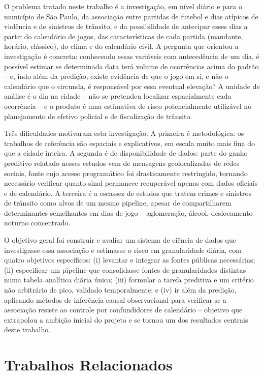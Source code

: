 \documentclass[12pt]{article}
\begin{document}
O problema tratado neste trabalho é a investigação, em nível diário e para
o município de São Paulo, da associação entre partidas de futebol e dias
atípicos de violência e de sinistros de trânsito, e da possibilidade de
antecipar esses dias a partir do calendário de jogos, das características
de cada partida (mandante, horário, clássico), do clima e do calendário
civil. A pergunta que orientou a investigação é concreta: conhecendo essas
variáveis com antecedência de um dia, é possível estimar se determinada
data terá volume de ocorrências acima do padrão -- e, indo além da
predição, existe evidência de que o jogo em si, e não o calendário que o
circunda, é responsável por essa eventual elevação? A unidade de análise é
o dia na cidade -- não se pretendeu localizar espacialmente cada
ocorrência -- e o produto é uma estimativa de risco potencialmente
utilizável no planejamento de efetivo policial e de fiscalização de
trânsito.

Três dificuldades motivaram esta investigação. A primeira é metodológica:
os trabalhos de referência \cite{kurland2014,ristea2018,ristea2020} são
espaciais e explicativos, em escala muito mais fina do que a cidade
inteira. A segunda é de disponibilidade de dados: parte do ganho preditivo
relatado nesses estudos vem de mensagens geolocalizadas de redes sociais,
fonte cujo acesso programático foi drasticamente restringido, tornando
necessário verificar quanto sinal permanece recuperável apenas com dados
oficiais e de calendário. A terceira é a escassez de estudos que tratem
crimes e sinistros de trânsito como alvos de um mesmo pipeline, apesar de
compartilharem determinantes semelhantes em dias de jogo -- aglomeração,
álcool, deslocamento noturno concentrado.

O objetivo geral foi construir e avaliar um sistema de ciência de dados
que investigasse essa associação e estimasse o risco em granularidade
diária, com quatro objetivos específicos: (i) levantar e integrar as
fontes públicas necessárias; (ii) especificar um pipeline que consolidasse
fontes de granularidades distintas numa tabela analítica diária única;
(iii) formular a tarefa preditiva e um critério não arbitrário de pico,
validado temporalmente; e (iv) ir além da predição, aplicando métodos de
inferência causal observacional para verificar se a associação resiste ao
controle por confundidores de calendário -- objetivo que extrapolou a
ambição inicial do projeto e se tornou um dos resultados centrais deste
trabalho.

\section{Trabalhos Relacionados}
\end{document}
